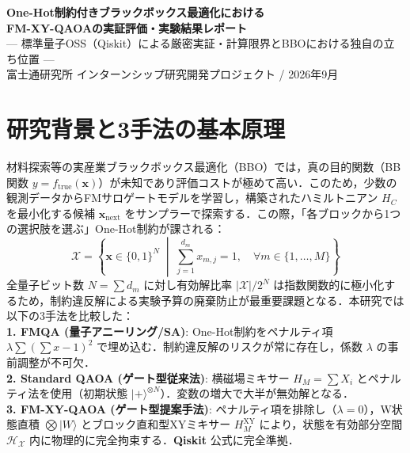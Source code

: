 \documentclass[11pt,a4paper]{ltjsarticle}
\newcommand{\ket}[1]{|#1\rangle}
\begin{document}
\begin{center}
\vspace*{-14mm}
{\LARGE\textbf{One-Hot制約付きブラックボックス最適化における\\[1mm]FM-XY-QAOAの実証評価・実験結果レポート}}\\[1mm]
{\large--- 標準量子OSS（Qiskit）による厳密実証・計算限界とBBOにおける独自の立ち位置 ---}\\[0.5mm]
{\normalsize 富士通研究所 インターンシップ研究開発プロジェクト \quad / \quad 2026年9月}
\vspace{-3.5mm}
\end{center}

\section{研究背景と3手法の基本原理}
\label{sec:overview}
\vspace{-2mm}
材料探索等の実産業ブラックボックス最適化（BBO）では，真の目的関数（BB関数 $y = f_{\mathrm{true}}(\bm{x})$）が未知であり評価コストが極めて高い．このため，少数の観測データからFMサロゲートモデルを学習し，構築されたハミルトニアン $H_C$ を最小化する候補 $\bm{x}_{\mathrm{next}}$ をサンプラーで探索する．この際，「各ブロックから1つの選択肢を選ぶ」One-Hot制約が課される：
\begin{equation}
\mathcal{X} = \left\{ \bm{x} \in \{0, 1\}^N \;\middle|\; \sum_{j=1}^{d_m} x_{m, j} = 1, \quad \forall m \in \{1, \dots, M\} \right\}
\end{equation}
全量子ビット数 $N = \sum d_m$ に対し有効解比率 $|\mathcal{X}|/2^N$ は指数関数的に極小化するため，制約違反解による実験予算の廃棄防止が最重要課題となる．本研究では以下の3手法を比較した：\\[0.5mm]
\textbf{1. FMQA (量子アニーリング/SA)}: One-Hot制約をペナルティ項 $\lambda \sum (\sum x - 1)^2$ で埋め込む．制約違反解のリスクが常に存在し，係数 $\lambda$ の事前調整が不可欠．\\[0.3mm]
\textbf{2. Standard QAOA (ゲート型従来法)}: 横磁場ミキサー $H_M = \sum X_i$ とペナルティ法を使用（初期状態 $\ket{+}^{\otimes N}$）．変数の増大で大半が無効解となる．\\[0.3mm]
\textbf{3. FM-XY-QAOA (ゲート型提案手法)}: ペナルティ項を排除し（$\lambda = 0$），W状態直積 $\bigotimes \ket{W}$ とブロック直和型XYミキサー $H_M^{\mathrm{XY}}$ により，状態を有効部分空間 $\mathcal{H}_{\mathcal{X}}$ 内に物理的に完全拘束する．\textbf{Qiskit} 公式に完全準拠．
\end{document}

